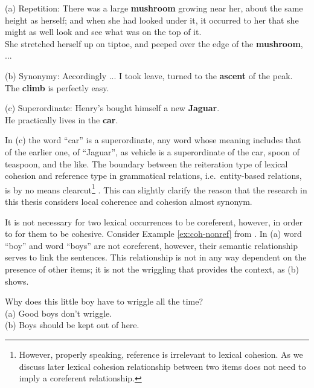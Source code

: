 \begin{examples}
	\label{ex:coh-lex}
	(a) Repetition: There was a large \textbf{mushroom} growing near her, about the same height as herself; and when she had looked under it, it occurred to her that she might as well look and see what was on the top of it.\\
	She stretched herself up on tiptoe, and peeped over the edge of the \textbf{mushroom}, ... 

	(b) Synonymy: Accordingly ... I took leave, turned to the \textbf{ascent} of the peak. \\
	The \textbf{climb} is perfectly easy. 

	(c) Superordinate: Henry's bought himself a new \textbf{Jaguar}. \\
	He practically lives in the \textbf{car}. 

\end{examples} 

In (c) the word ``car'' is a superordinate, any word whose meaning includes that of the earlier one, of ``Jaguar'', as vehicle is a superordinate of the car, spoon of teaspoon, and the like. 
The boundary between the reiteration type of lexical cohesion and reference type in grammatical relations, i.e.\ entity-based relations, is by no means clearcut\footnote{However, properly speaking, reference is irrelevant to lexical cohesion. As we discuss later lexical cohesion relationship between two items does not need to imply a coreferent relationship.} \cite{halliday78}. 
This can slightly clarify the reason that the research in this thesis considers local coherence and cohesion almost synonym.

It is not necessary for two lexical occurrences to be coreferent, however, in order to for them to be cohesive. Consider Example \ref{ex:coh-nonref} from . 
In (a) word ``boy'' and  word ``boys'' are not coreferent, however, their semantic relationship serves to link the sentences. 
This relationship is not in any way dependent on the presence of other items; it is not the wriggling that provides the context, as (b) shows. 

\begin{examples}
	\label{ex:coh-nonref}
	Why does this little boy have to wriggle all the time? \\
	(a) Good boys don't wriggle. \\
	(b) Boys should be kept out of here. \\
\end{examples} 



